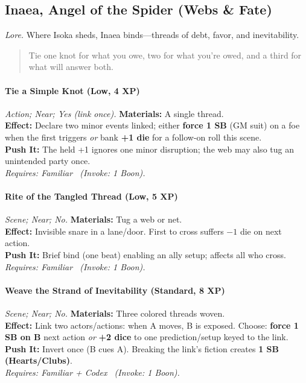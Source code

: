 \subsection{Inaea, Angel of the Spider (Webs \& Fate)}
\textit{Lore.} Where Isoka sheds, Inaea binds—threads of debt, favor, and inevitability.

\begin{quote}
Tie one knot for what you owe, two for what you’re owed, and a third for what will answer both.
\end{quote}

\paragraph{Tie a Simple Knot (Low, 4 XP)} \emph{Action; Near; Yes (link once).}
\textbf{Materials:} A single thread.\\
\textbf{Effect:} Declare two minor events linked; either \textbf{force 1 SB} (GM suit) on a foe when the first triggers \emph{or} bank \textbf{+1 die} for a follow-on roll this scene.\\
\textbf{Push It:} The held +1 ignores one minor disruption; the web may also tug an unintended party once.\\
\emph{Requires: Familiar \ (\textit{Invoke:} 1 Boon).}

\paragraph{Rite of the Tangled Thread (Low, 5 XP)} \emph{Scene; Near; No.}
\textbf{Materials:} Tug a web or net.\\
\textbf{Effect:} Invisible snare in a lane/door. First to cross suffers \(-1\) die on next action.\\
\textbf{Push It:} Brief bind (one beat) enabling an ally setup; affects all who cross.\\
\emph{Requires: Familiar \ (\textit{Invoke:} 1 Boon).}

\paragraph{Weave the Strand of Inevitability (Standard, 8 XP)} \emph{Scene; Near; No.}
\textbf{Materials:} Three colored threads woven.\\
\textbf{Effect:} Link two actors/actions: when A moves, B is exposed. Choose: \textbf{force 1 SB on B} next action \emph{or} \textbf{+2 dice} to one prediction/setup keyed to the link.\\
\textbf{Push It:} Invert once (B cues A). Breaking the link’s fiction creates \textbf{1 SB (Hearts/Clubs)}.\\
\emph{Requires: Familiar + Codex \ (\textit{Invoke:} 1 Boon).}

